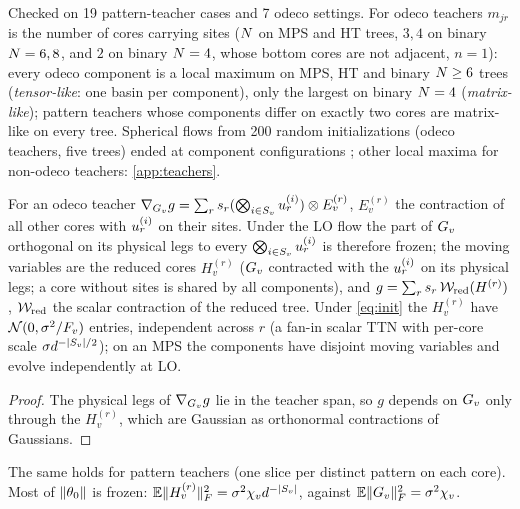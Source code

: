 Checked on 19 pattern-teacher cases and 7 odeco settings. For odeco teachers $m_{jr}$ is the number of
cores carrying sites ($N$ on MPS and HT trees, $3,4$ on binary $N=6,8$, and $2$ on binary $N=4$, whose
bottom cores are not adjacent, $n=1$): every odeco component is a local maximum on MPS, HT and binary
$N\ge6$ trees (\emph{tensor-like}: one basin per component), only the largest on binary $N=4$
(\emph{matrix-like}); pattern teachers whose components differ on exactly two cores are matrix-like on
every tree. Spherical flows from 200 random initializations (odeco teachers, five trees) ended at
component configurations \empirical; other local maxima for non-odeco teachers: \cref{app:teachers}.

\begin{proposition}\label{prop:A-reduced}
  \proven{} 
  For an odeco teacher $\nabla_{G_{v}}g=\sum_rs_{r}(\bigotimes_{i\in S_{v}}u_{r}^{(i)})\otimes E^{(r)}_v$, $E^{(r)}_v$ the contraction
  of all other cores with $u_{r}^{(i)}$ on their sites. Under the LO flow the part of $G_{v}$ orthogonal on its
  physical legs to every $\bigotimes_{i\in S_{v}}u_{r}^{(i)}$ is therefore frozen; the moving variables are the
  reduced cores $H^{(r)}_v$ ($G_{v}$ contracted with the $u_{r}^{(i)}$ on its physical legs; a core without sites is
  shared by all components), and $g=\sum_rs_{r}\,\mathcal W_{\rm red}(H^{(r)})$, $\mathcal W_{\rm red}$ the scalar
  contraction of the reduced tree. Under \eqref{eq:init} the $H^{(r)}_v$ have \iid $\mathcal{N}(0,\sigma^2/F_{v})$
  entries, independent across $r$ (a fan-in scalar TTN with per-core scale $\sigma d^{-\lvert S_{v}\rvert/2}$); on an MPS
  the components have disjoint moving variables and evolve independently at LO.
\end{proposition}
\begin{proof}
  The physical legs of $\nabla_{G_{v}}g$ lie in the teacher span, so $g$ depends on $G_{v}$ only through the
  $H^{(r)}_v$, which are \iid Gaussian as orthonormal contractions of \iid Gaussians.
\end{proof}
The same holds for pattern teachers (one slice per distinct pattern on each core). Most of $\lVert\theta_0\rVert$ is
frozen: $\mathbb{E}\lVert H^{(r)}_v\rVert_{F}^2=\sigma^2\chi_{v}d^{-\lvert S_{v}\rvert}$, against $\mathbb{E}\lVert G_{v}\rVert_{F}^2=\sigma^2\chi_{v}$.

